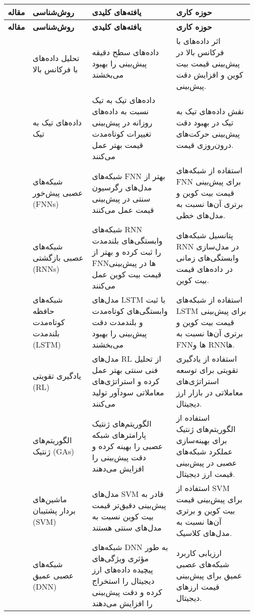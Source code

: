 \begin{longtable}{|c|p{1.5cm}|p{4cm}|p{3.5cm}|}
	\hline
	\textbf{مقاله} & \textbf{روش‌شناسی} & \textbf{یافته‌های کلیدی} & \textbf{حوزه کاری} \\
	\hline
	\endfirsthead
	\hline
	\textbf{مقاله} & \textbf{روش‌شناسی} & \textbf{یافته‌های کلیدی} & \textbf{حوزه کاری} \\
	\hline
	\endhead
	\hline
	\endfoot
	\hline
	\cite{author1} & تحلیل داده‌های با فرکانس بالا & داده‌های سطح دقیقه پیش‌بینی را بهبود می‌بخشند & اثر داده‌های با فرکانس بالا در پیش‌بینی قیمت بیت کوین و افزایش دقت پیش‌بینی. \\
	\hline
	\cite{author2} & داده‌های تیک به تیک & داده‌های تیک به تیک نسبت به داده‌های روزانه در پیش‌بینی تغییرات کوتاه‌مدت قیمت بهتر عمل می‌کنند & نقش داده‌های تیک به تیک در بهبود دقت پیش‌بینی حرکت‌های درون‌روزی قیمت. \\
	\hline
	\cite{author3} & شبکه‌های عصبی پیش‌خور (FNNs) & شبکه‌های FNN بهتر از مدل‌های رگرسیون سنتی در پیش‌بینی قیمت عمل می‌کنند & استفاده از شبکه‌های FNN برای پیش‌بینی قیمت بیت کوین و برتری آن‌ها نسبت به مدل‌های خطی. \\
	\hline
	\cite{author4} & شبکه‌های عصبی بازگشتی (RNNs) & شبکه‌های RNN وابستگی‌های بلندمدت را ثبت کرده و بهتر از FNNها در پیش‌بینی قیمت بیت کوین عمل می‌کنند & پتانسیل شبکه‌های RNN در مدل‌سازی وابستگی‌های زمانی در داده‌های قیمت بیت کوین. \\
	\hline
	\cite{author5} & شبکه‌های حافظه کوتاه‌مدت بلندمدت (LSTM) & مدل‌های LSTM با ثبت وابستگی‌های کوتاه‌مدت و بلندمدت دقت پیش‌بینی را بهبود می‌بخشند & استفاده از شبکه‌های LSTM برای پیش‌بینی قیمت بیت کوین و برتری آن‌ها نسبت به FNNها و RNNها. \\
	\hline
	\cite{author6} & یادگیری تقویتی (RL) & مدل‌های RL از تحلیل فنی سنتی بهتر عمل کرده و استراتژی‌های معاملاتی سودآور تولید می‌کنند & استفاده از یادگیری تقویتی برای توسعه استراتژی‌های معاملاتی در بازار ارز دیجیتال. \\
	\hline
	\cite{author7} & الگوریتم‌های ژنتیک (GAs) & الگوریتم‌های ژنتیک پارامترهای شبکه عصبی را بهینه کرده و دقت پیش‌بینی را افزایش می‌دهند & استفاده از الگوریتم‌های ژنتیک برای بهینه‌سازی عملکرد شبکه‌های عصبی در پیش‌بینی قیمت ارز دیجیتال. \\
	\hline
	\cite{author8} & ماشین‌های بردار پشتیبان (SVM) & مدل‌های SVM قادر به پیش‌بینی دقیق‌تر قیمت بیت کوین نسبت به مدل‌های سنتی هستند & استفاده از SVM برای پیش‌بینی قیمت بیت کوین و برتری آن‌ها نسبت به مدل‌های کلاسیک. \\
	\hline
	\cite{author9} & شبکه‌های عصبی عمیق (DNN) & شبکه‌های DNN به طور مؤثری ویژگی‌های پیچیده داده‌های ارز دیجیتال را استخراج کرده و دقت پیش‌بینی را افزایش می‌دهند & ارزیابی کاربرد شبکه‌های عصبی عمیق برای پیش‌بینی قیمت ارزهای دیجیتال. \\

\end{longtable}
